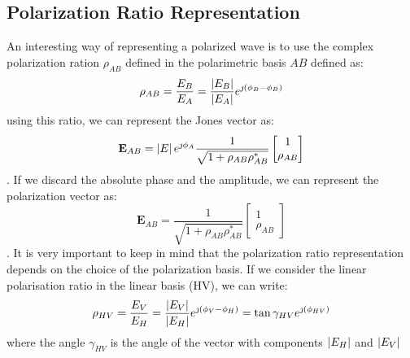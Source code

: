 \documentclass[11pt]{article}
\begin{document}
\subsection{Polarization Ratio Representation}
An interesting way of representing a polarized wave is to use the complex polarization ration $\rho_{AB}$ defined in the polarimetric basis $AB$ defined as:
\begin{equation}
	\rho_{AB} = \frac{E_{B}}{E_{A}} = \frac{\left|E_{B}\right|}{\left|E_{A}\right|}e^{\jmath\left(\phi_B - \phi_B\right)}
\end{equation}
using this ratio, we can represent the Jones vector as:
\begin{equation}
	\mathbf{E}_{AB} = \left|E\right| e^{\jmath\phi_{A}} \frac{1}{\sqrt{1 + \rho_{AB}\rho_{AB}^{*}}}
	 \begin{bmatrix}1\\\rho_{AB}\end{bmatrix}
\end{equation}.
If we discard the absolute phase and the amplitude, we can represent the polarization vector as:
\begin{equation}
	\mathbf{E}_{AB} =  \frac{1}{\sqrt{1 + \rho_{AB}\rho_{AB}^{*}}}
	 \begin{bmatrix}1\\\rho_{AB}\end{bmatrix}
\end{equation}.
It is very important to keep in mind that the polarization ratio representation depends on the choice of the polarization basis. 
If we consider the linear polarisation ratio in the linear basis (HV), we can write:
\begin{equation}
	\rho_{HV} = \frac{E_{V}}{E_{H}} = \frac{\left|E_{V}\right|}{\left|E_{H}\right|}
	e^{\jmath\left(\phi_{V} - \phi_{H}\right)} =
	\tan{\gamma_{HV}}e^{\jmath\left(\phi_{HV}\right)}
\end{equation}
where the angle $\gamma_{HV}$ is the angle of the vector with components $\left|E_{H}\right|$ and $\left|E_{V}\right|$
\end{document}
